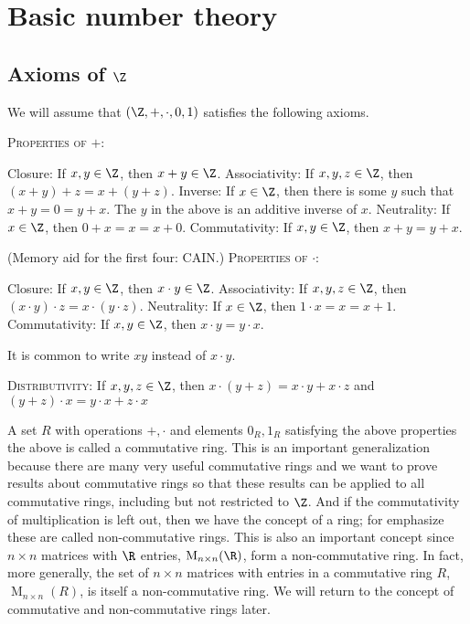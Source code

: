 \chapter{Basic number theory}


\section{Axioms of $\Z$}

We will assume that $(\Z, +, \cdot, 0, 1)$ satisfies the following
axioms.
\begin{enumerate}[nosep]
  \li \textsc{Properties of $+$:}
  \begin{enumerate}[nosep]
    \li Closure: If $x, y \in \Z$, then $x + y \in \Z$.
    \li Associativity: If $x, y, z \in \Z$, then $(x + y) + z = x + (y + z)$.
    \li Inverse: If $x \in \Z$, then there is some $y$ such that $x + y = 0 = y + x$.
      The $y$ in the above is an additive inverse of $x$.
    \li Neutrality: If $x \in \Z$, then $0 + x = x = x + 0$.
    \li Commutativity: If $x, y \in \Z$, then $x + y = y + x$.
  \end{enumerate}
  (Memory aid for the first four: CAIN.)
  \li \textsc{Properties of $\cdot$:}
  \begin{enumerate}[nosep]
  \li Closure: If $x, y \in \Z$, then $x \cdot y \in \Z$.
  \li Associativity: If $x, y, z \in \Z$, then $(x \cdot y) \cdot z = x \cdot (y \cdot z)$.
  \li Neutrality: If $x \in \Z$, then $1 \cdot x = x = x + 1$.
  \li Commutativity: If $x, y \in \Z$, then $x \cdot y = y \cdot x$.
  \end{enumerate}
  It is common to write $xy$ instead of $x \cdot y$.

  \li \textsc{Distributivity}:
  If $x, y, z \in \Z$, then
  $x \cdot (y + z) = x \cdot y + x \cdot z$
  and
  $(y + z) \cdot x = y \cdot x + z \cdot x$
    
\end{enumerate}

A set $R$ with operations $+, \cdot$ and elements $0_R, 1_R$ satisfying
the above properties the above is called a commutative ring.
This is an important generalization because there are many
very useful commutative rings and we want to prove results about
commutative rings so that these results can be applied to all
commutative rings, including but not restricted to $\Z$.
And if the commutativity of multiplication is left out, then we have the
concept of a ring; for emphasize these are called non-commutative rings.
This is also an important concept since $n \times n$ matrices with $\R$
entries, $\operatorname{M}_{n \times n}(\R)$, form a non-commutative ring.
In fact, more generally,
the set of $n\times n$ matrices with entries in a commutative ring $R$,
$\operatorname{M}_{n \times n}(R)$,
is itself a non-commutative ring.
We will return to the concept of commutative and non-commutative rings later.

